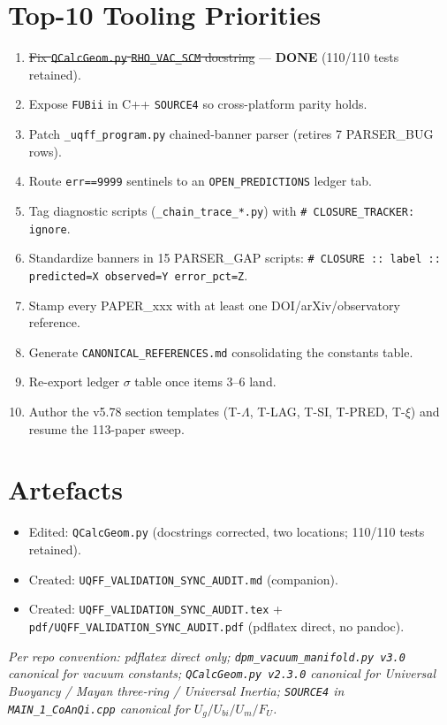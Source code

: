 \documentclass[11pt]{article}
\begin{document}
\section{Top-10 Tooling Priorities}
\begin{enumerate}
  \item \st{Fix \texttt{QCalcGeom.py} \texttt{RHO\_VAC\_SCM} docstring} --- \textbf{DONE} (110/110 tests retained).
  \item Expose \texttt{FUBii} in C++ \texttt{SOURCE4} so cross-platform parity holds.
  \item Patch \texttt{\_uqff\_program.py} chained-banner parser (retires 7 PARSER\_BUG rows).
  \item Route \texttt{err==9999} sentinels to an \texttt{OPEN\_PREDICTIONS} ledger tab.
  \item Tag diagnostic scripts (\texttt{\_chain\_trace\_*.py}) with \texttt{\# CLOSURE\_TRACKER: ignore}.
  \item Standardize banners in 15 PARSER\_GAP scripts: \texttt{\# CLOSURE :: label :: predicted=X observed=Y error\_pct=Z}.
  \item Stamp every PAPER\_xxx with at least one DOI/arXiv/observatory reference.
  \item Generate \texttt{CANONICAL\_REFERENCES.md} consolidating the constants table.
  \item Re-export ledger $\sigma$ table once items 3--6 land.
  \item Author the v5.78 section templates (T-$\Lambda$, T-LAG, T-SI, T-PRED, T-$\xi$) and resume the 113-paper sweep.
\end{enumerate}

\section{Artefacts}
\begin{itemize}
  \item Edited: \texttt{QCalcGeom.py} (docstrings corrected, two locations; 110/110 tests retained).
  \item Created: \texttt{UQFF\_VALIDATION\_SYNC\_AUDIT.md} (companion).
  \item Created: \texttt{UQFF\_VALIDATION\_SYNC\_AUDIT.tex} + \texttt{pdf/UQFF\_VALIDATION\_SYNC\_AUDIT.pdf} (pdflatex direct, no pandoc).
\end{itemize}

\noindent\emph{Per repo convention: pdflatex direct only; \texttt{dpm\_vacuum\_manifold.py v3.0} canonical for vacuum constants; \texttt{QCalcGeom.py v2.3.0} canonical for Universal Buoyancy / Mayan three-ring / Universal Inertia; \texttt{SOURCE4} in \texttt{MAIN\_1\_CoAnQi.cpp} canonical for $U_g/U_{bi}/U_m/F_U$.}
\end{document}
